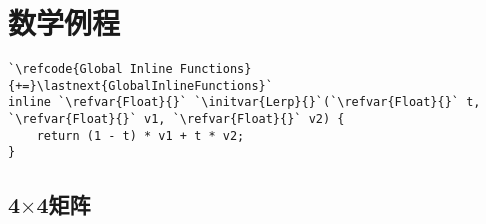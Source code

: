 \section{数学例程}\label{sec:数学例程}

\begin{lstlisting}
`\refcode{Global Inline Functions}{+=}\lastnext{GlobalInlineFunctions}`
inline `\refvar{Float}{}` `\initvar{Lerp}{}`(`\refvar{Float}{}` t, `\refvar{Float}{}` v1, `\refvar{Float}{}` v2) {
    return (1 - t) * v1 + t * v2;
}
\end{lstlisting}

\subsection{4$\times$4矩阵}\label{sub:4x4矩阵}